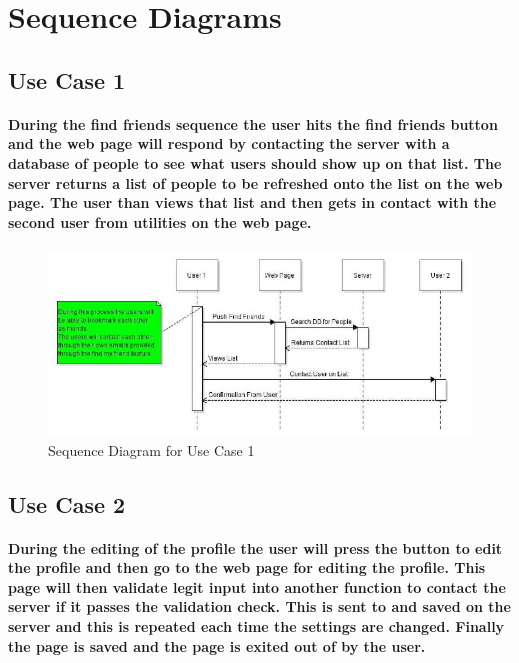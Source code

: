 \documentclass[12pt]{article}
\begin{document}
\newpage
\section{\bf Sequence Diagrams}
  \subsection{\bf Use Case 1}
      \paragraph{\normalfont \indent During the find friends sequence the user hits the find friends button and the web page will respond by contacting the server with a database of people to see what users should show up on that list. The server returns a list of people to be refreshed onto the list on the web page. The user than views that list and then gets in contact with the second user from utilities on the web page.
      }

      \begin{figure}[H]
              \includegraphics[width =\linewidth]{sequenceDiagram1.eps}
                \caption{Sequence Diagram for Use Case 1}
                \label{fig: Sequence Diagram 1}
      \end{figure}

  \newpage
  \subsection{\bf Use Case 2}
      \paragraph{\normalfont \indent During the editing of the profile the user will press the button to edit the profile and then go to the web page for editing the profile. This page will then validate legit input into another function to contact the server if it passes the validation check. This is sent to and saved on the server and this is repeated each time the settings are changed. Finally the page is saved and the page is exited out of by the user.
      }
\end{document}
